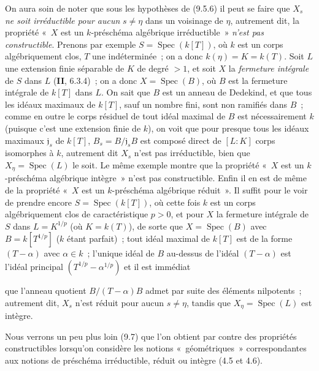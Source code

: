 \begin{remark}[9.5.7]
\label{IV.9.5.7-fr}
On aura soin de noter que sous les hypothèses de (9.5.6) il peut se faire que
$X_s$ \emph{ne soit irréductible pour aucun} $s\neq\eta$ dans un voisinage de
$\eta$, autrement dit, la propriété «~$X$ est un $k$-préschéma algébrique
irréductible~» \emph{n'est pas constructible}. Prenons par exemple
$S=\operatorname{Spec}(k[T])$, où $k$ est un corps algébriquement clos, $T$ une
indéterminée~; on a donc $k(\eta)=K=k(T)$. Soit $L$ une extension finie
séparable de $K$ de degré $>1$, et soit $X$ la \emph{fermeture intégrale} de
$S$ dans $L$ (\textbf{II}, 6.3.4)~; on a donc $X=\operatorname{Spec}(B)$, où
$B$ est la fermeture intégrale de $k[T]$ dans $L$. On sait que $B$ est un
anneau de Dedekind, et que tous les idéaux maximaux de $k[T]$, sauf un nombre
fini, sont non ramifiés dans $B$~; comme en outre le corps résiduel de tout
idéal maximal de $B$ est nécessairement $k$ (puisque c'est une extension finie
de $k$), on voit que pour presque tous les idéaux maximaux $\mathfrak j_s$ de
$k[T]$, $B_s=B/\mathfrak j_sB$ est composé direct de $[L:K]$ corps isomorphes
à $k$, autrement dit $X_s$ n'est pas irréductible, bien que
$X_\eta=\operatorname{Spec}(L)$ le soit. Le même exemple montre que la
propriété «~$X$ est un $k$-préschéma algébrique intègre~» n'est pas
constructible. Enfin il en est de même de la propriété «~$X$ est un
$k$-préschéma algébrique réduit~». Il suffit pour le voir de prendre encore
$S=\operatorname{Spec}(k[T])$, où cette fois $k$ est un corps algébriquement
clos de caractéristique $p>0$, et pour $X$ la fermeture intégrale de $S$ dans
$L=K^{1/p}$ (où $K=k(T)$), de sorte que $X=\operatorname{Spec}(B)$ avec
$B=k[T^{1/p}]$ ($k$ étant parfait)~; tout idéal maximal de $k[T]$ est de la
forme $(T-\alpha)$ avec $\alpha\in k$~; l'unique idéal de $B$ au-dessus de
l'idéal $(T-\alpha)$ est l'idéal principal
$(T^{1/p}-\alpha^{1/p})$ et il est immédiat


que l'anneau quotient $B/(T-\alpha)B$ admet par suite des éléments nilpotents~;
autrement dit, $X_s$ n'est réduit pour aucun $s\neq\eta$, tandis que
$X_\eta=\operatorname{Spec}(L)$ est intègre.

Nous verrons un peu plus loin (9.7) que l'on obtient par contre des propriétés
constructibles lorsqu'on considère les notions «~géométriques~»
correspondantes aux notions de préschéma irréductible, réduit ou intègre (4.5
et 4.6).
\end{remark}

